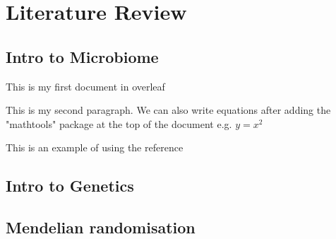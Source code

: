 \chapter{Literature Review}

\section{Intro to Microbiome}
This is my first document in overleaf 

This is my second paragraph. We can also write equations after adding the "mathtools" package at the top of the document e.g. $y=x^2$

This is an example of using the reference \cite{texbook}

\section{Intro to Genetics}

\section{Mendelian randomisation}